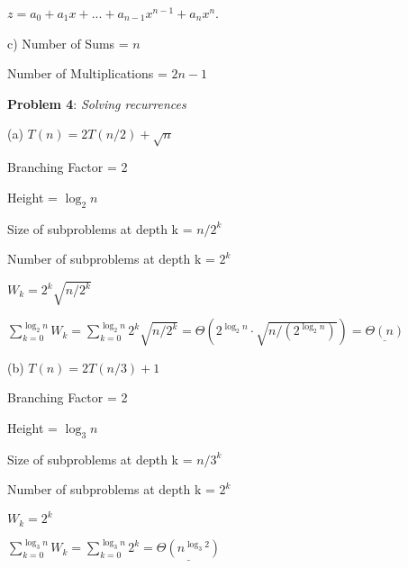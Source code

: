 \documentclass{article} %
\newcommand{\question}[2][]{\begin{flushleft}
        \textbf{Problem #1}: \textit{#2}

\end{flushleft}}
\begin{document}
    \hspace{10pt} $z = a_0 + a_1x + ... + a_{n - 1}x^{n - 1} + a_nx^n$. 

    \vspace{7pt}

    


    c) Number of Sums = $n$

    \hspace{12pt}Number of Multiplications = $2n - 1$

    \newpage

    \question[4]{Solving recurrences}

    (a) $T(n) = 2T(n / 2) + \sqrt{n}$
    
    \hspace{13pt} Branching Factor = 2
    
    \hspace{13pt} Height = $\log_2n $

    \hspace{13pt} Size of subproblems at depth k = $n/2^k$

    \hspace{13pt} Number of subproblems at depth k = $2^k$

    \hspace{13pt} $W_k = 2^k \sqrt{n/2^k}$

    \hspace{13pt} $\sum^{\log_2 n}_{k = 0} W_k = \sum^{\log_2 n}_{k = 0} 2^k \sqrt{n/2^k} = \Theta(2^{\log_2n} \cdot \sqrt{n/(2^{\log_2n})}) = \underline{\Theta(n)}$

    \vspace{5pt}

    (b) $T(n) = 2T(n / 3) + 1$

    \hspace{13pt} Branching Factor = 2
    
    \hspace{13pt} Height = $\log_3n $

    \hspace{13pt} Size of subproblems at depth k = $n / 3^k$
    
    \hspace{13pt} Number of subproblems at depth k = $2^k$

    \hspace{13pt} $W_k = 2^k$

    \hspace{13pt} $\sum^{\log_3 n}_{k = 0} W_k = \sum^{\log_3 n}_{k = 0} 2^k = \underline{\Theta(n^{\log_3 2})}$
    
\end{document}
